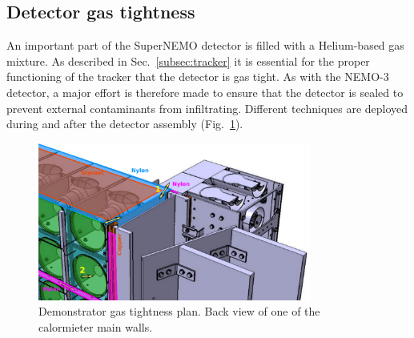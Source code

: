 \subsection{Detector gas tightness}
\label{subsec:sealing}


An important part of the SuperNEMO detector is filled with a Helium-based gas mixture.
As described in Sec.~\ref{subsec:tracker} it is essential for the proper functioning of the tracker that the detector is gas tight.
As with the NEMO-$3$ detector, a major effort is therefore made to ensure that the detector is sealed to prevent external contaminants from infiltrating.
Different techniques are deployed during and after the detector assembly (Fig.~\ref{fig:sealing_plan}).
\begin{figure}[h!]
\centering
\includegraphics[width=0.8\textwidth]{SNdemonstrator/fig_SNdemonstrator/leaks.pdf}
\caption{Demonstrator gas tightness plan.
  Back view of one of the calormieter main walls.
\label{fig:sealing_plan}}
\end{figure}
